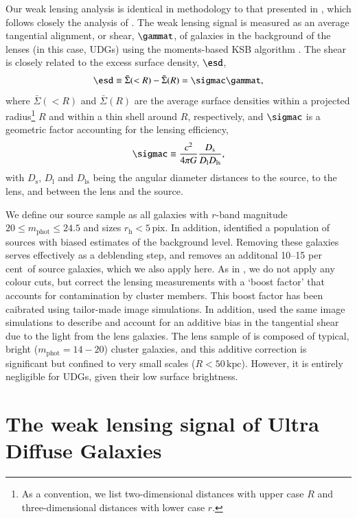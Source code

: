 \documentclass[usenatbib,fleqn]{mnras}
\def\percent{ per cent}
\begin{document}
Our weak lensing analysis is identical in methodology to that presented in \cite{sifon16_satellites}, which follows closely the analysis of \cite{hoekstra15}. The weak lensing signal is measured as an average tangential alignment, or shear, $\gammat$, of galaxies in the background of the lenses (in this case, UDGs) using the moments-based KSB algorithm \citep{kaiser95,luppino97,hoekstra98}. The shear is closely related to the excess surface density, $\esd$, 
\begin{equation}
 \esd \equiv \bar\Sigma(<R) - \bar\Sigma(R) = \sigmac\gammat,
\end{equation}
where $\bar\Sigma(<R)$ and $\bar\Sigma(R)$ are the average surface densities within a projected radius\footnote{As a convention, we list two-dimensional distances with upper case $R$ and three-dimensional distances with lower case $r$.} $R$ and within a thin shell around $R$, respectively, and $\sigmac$ is a geometric factor accounting for the lensing efficiency,
\begin{equation}
 \sigmac \equiv \frac{c^2}{4\pi G} \frac{D_\mathrm{s}}{D_\mathrm{l}D_\mathrm{ls}},
\end{equation}
with $D_\mathrm{s}$, $D_\mathrm{l}$ and $D_\mathrm{ls}$ being the angular diameter distances to the source, to the lens, and between the lens and the source.

We define our source sample as all galaxies with $r$-band magnitude $20\leq m_\mathrm{phot} \leq 24.5$ and sizes $r_\mathrm{h}<5\,\mathrm{pix}$. In addition, \citet{sifon16_satellites} identified a population of sources with biased estimates of the background level. Removing these galaxies serves effectively as a deblending step, and removes an additonal 10--15\percent\ of source galaxies, which we also apply here. As in \cite{sifon16_satellites}, we do not apply any colour cuts, but correct the lensing measurements with a `boost factor' that accounts for contamination by cluster members. This boost factor has been caibrated using tailor-made image simulations. In addition, \cite{sifon16_satellites} used the same image simulations to describe and account for an additive bias in the tangential shear due to the light from the lens galaxies. The lens sample of \cite{sifon16_satellites} is composed of typical, bright ($m_\mathrm{phot}=14-20$) cluster galaxies, and this additive correction is significant but confined to very small scales ($R<50\,\mathrm{kpc}$). However, it is entirely negligible for UDGs, given their low surface brightness.


\section{The weak lensing signal of Ultra Diffuse Galaxies}
\label{s:results}
\end{document}
